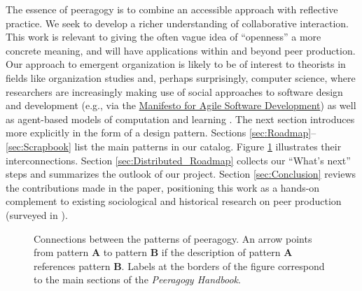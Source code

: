 
%  

The essence of peeragogy is to combine an accessible approach with reflective practice.   We seek to develop a richer understanding of collaborative interaction.  This work is relevant to giving the often vague idea of ``openness'' a more concrete meaning, and will have applications within and beyond peer production.  Our approach to emergent organization is likely to be of interest to theorists in fields like organization studies and, perhaps surprisingly, computer science, where researchers are increasingly making use of social approaches to software design and development (e.g., via the \href{http://www.agilemanifesto.org/}{Manifesto for Agile Software Development}) as well as agent-based models of computation and learning \cite{minsky1967programming,poetry-workshop}.  The next section introduces  more explicitly in the form of a design pattern.  Sections \ref{sec:Roadmap}--\ref{sec:Scrapbook} list the main patterns in our catalog.    Figure \ref{fig:connections} illustrates their interconnections.  Section \ref{sec:Distributed_Roadmap} collects our ``What's next'' steps and summarizes the outlook of our project. Section \ref{sec:Conclusion} reviews the contributions made in the paper, positioning this work as a hands-on complement to existing sociological and historical research on peer production (surveyed in \cite{benkler2015peer}).

\begin{figure}
\vspace{-.9in}
{\centering


\par
}
\vspace{-.9in}
\caption{Connections between the patterns of peeragogy.  An arrow points from pattern \textbf{A} to pattern \textbf{B} if the description of pattern \textbf{A} references pattern \textbf{B}. Labels at the borders of the figure correspond to the main sections of the \emph{Peeragogy Handbook}.\label{fig:connections}}
\end{figure}


